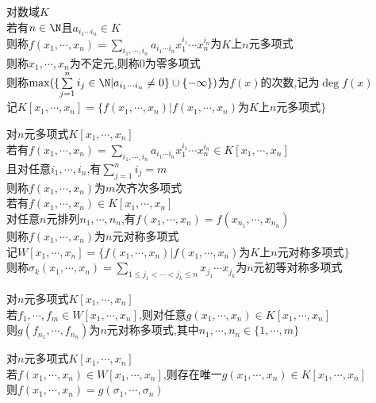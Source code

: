 \begin{dingyi}
对数域$K$\\
若有$n\in\N$且$a_{i_1\cdots i_n}\in K$\\
则称$f(x_1,\cdots,x_n)=\sum\limits_{i_1,\cdots,i_n}a_{i_1\cdots i_n}x_1^{i_1}\cdots x_n^{i_n}$为$K$上$n$元多项式\\
则称$x_1,\cdots,x_n$为不定元,则称$0$为零多项式\\
则称$\max(\{\sum\limits_{j=1}^{n}i_j\in\N|a_{i_1\cdots i_n}\neq 0\}\cup\{-\infty\})$为$f(x)$的次数,记为$\deg f(x)$\\
记$K[x_1,\cdots,x_n]=\{f(x_1,\cdots,x_n)|f(x_1,\cdots,x_n)\text{为}K\text{上}n\text{元多项式}\}$
\end{dingyi}

\begin{dingyi}
对$n$元多项式$K[x_1,\cdots,x_n]$\\
若有$f(x_1,\cdots,x_n)=\sum\limits_{i_1,\cdots,i_n}a_{i_1\cdots i_n}x_1^{i_1}\cdots x_n^{i_n}\in K[x_1,\cdots,x_n]$\\
且对任意$i_1,\cdots,i_n$,有$\sum\limits_{j=1}^{n}i_j=m$\\
则称$f(x_1,\cdots,x_n)$为$m$次齐次多项式\\
若有$f(x_1,\cdots,x_n)\in K[x_1,\cdots,x_n]$\\
对任意$n$元排列$n_1,\cdots,n_n$,有$f(x_1,\cdots,x_n)=f(x_{n_1},\cdots,x_{n_n})$\\
则称$f(x_1,\cdots,x_n)$为$n$元对称多项式\\
记$W[x_1,\cdots,x_n]=\{f(x_1,\cdots,x_n)|f(x_1,\cdots,x_n)\text{为}K\text{上}n\text{元对称多项式}\}$\\
则称$\sigma_{k}(x_1,\cdots,x_n)=\sum\limits_{1\leq j_1<\cdots<j_k\leq n}x_{j_1}\cdots x_{j_k}$为$n$元初等对称多项式
\end{dingyi}

\begin{dingli}
对$n$元多项式$K[x_1,\cdots,x_n]$\\
若$f_1,\cdots,f_m\in W[x_1,\cdots,x_n]$,则对任意$g(x_1,\cdots,x_n)\in K[x_1,\cdots,x_n]$\\
则$g(f_{n_1},\cdots,f_{n_n})$为$n$元对称多项式,其中$n_1,\cdots,n_n\in\{1,\cdots,m\}$
\end{dingli}

\begin{dingli}
对$n$元多项式$K[x_1,\cdots,x_n]$\\
若$f(x_1,\cdots,x_n)\in W[x_1,\cdots,x_n]$,则存在唯一$g(x_1,\cdots,x_n)\in K[x_1,\cdots,x_n]$\\
则$f(x_1,\cdots,x_n)=g(\sigma_1,\cdots,\sigma_n)$
\end{dingli}

